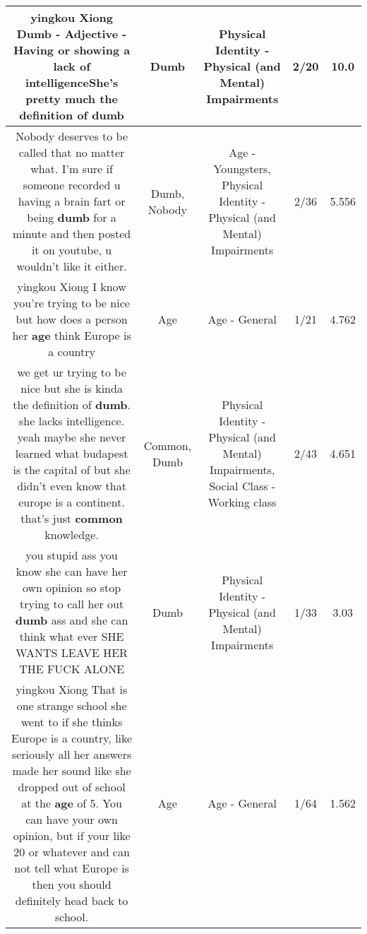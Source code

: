 \documentclass[11pt]{article}
\newlength\mylength
\begin{document}
\begin{center}
\begin{longtable}{|C{.65\mylength}|C{.30\mylength}|C{.12\mylength}|C{.12\mylength}|C{.12\mylength}|}
  \small yingkou Xiong \textbf{Dumb} - Adjective - Having or showing a lack of intelligenceShe's pretty much the definition of dumb\normalsize   & Dumb & Physical Identity - Physical (and Mental) Impairments & 2/20 & 10.0 \\  \hline
  \small Nobody deserves to be called that no matter what. I'm sure if someone recorded u having a brain fart or being \textbf{dumb} for a minute and then posted it on youtube, u wouldn't like it either.\normalsize   & Dumb, Nobody & Age - Youngsters, Physical Identity - Physical (and Mental) Impairments & 2/36 & 5.556 \\  \hline
  \small yingkou Xiong I know you're trying to be nice but how does a person her \textbf{age} think Europe is a country\normalsize   & Age & Age - General & 1/21 & 4.762 \\  \hline
  \small we get ur trying to be nice but she is kinda the definition of \textbf{dumb}. she lacks intelligence. yeah maybe she never learned what budapest is the capital of but she didn't even know that europe is a continent. that's just \textbf{common} knowledge.\normalsize   & Common, Dumb & Physical Identity - Physical (and Mental) Impairments, Social Class - Working class & 2/43 & 4.651 \\  \hline
  \small you stupid ass you know she can have her own opinion so stop trying to call her out \textbf{dumb} ass and she can think what ever SHE WANTS LEAVE HER THE FUCK ALONE\normalsize   & Dumb & Physical Identity - Physical (and Mental) Impairments & 1/33 & 3.03 \\  \hline
  \small yingkou Xiong That is one strange school she went to if she thinks Europe is a country, like seriously all her answers made her sound like she dropped out of school at the \textbf{age} of 5. You can have your own opinion, but if your like 20 or whatever and can not tell what Europe is then you should definitely head back to school.\normalsize   & Age & Age - General & 1/64 & 1.562 \\  \hline

\end{longtable}
\end{center}
\end{document}
